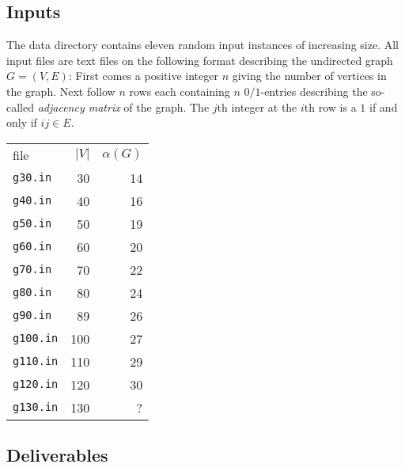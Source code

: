 \documentclass{tufte-handout}
\begin{document}
\subsection{Inputs}

The data directory contains eleven random input instances of
increasing size. 
All input files are text files on the following format describing the
undirected graph $G=(V,E)$: First comes a positive integer $n$ giving
the number of vertices in the graph.
Next follow $n$ rows each containing $n$ $0/1$-entries describing the
so-called \emph{adjacency matrix} of the graph.
The $j$th integer at the $i$th row is a $1$ if and only if $ij\in E$.

\begin{marginfigure}
\begin{tabular}{lrr}
file & $|V|$ & $\alpha(G)$\\
 \texttt{g30.in} & 30 & 14\\
 \texttt{g40.in} & 40 & 16\\
 \texttt{g50.in} & 50 & 19\\
 \texttt{g60.in} & 60 & 20\\
 \texttt{g70.in} & 70 & 22\\
 \texttt{g80.in} & 80 & 24\\
 \texttt{g90.in} & 89 & 26\\
 \texttt{g100.in} & 100 & 27\\
 \texttt{g110.in} & 110 & 29\\
 \texttt{g120.in} & 120 & 30\\
 \texttt{g130.in} & 130 &  ? 
\end{tabular}
\end{marginfigure}



\subsection{Deliverables}
\end{document}
